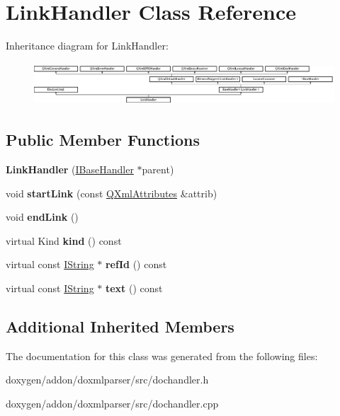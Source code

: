 \hypertarget{class_link_handler}{}\section{Link\+Handler Class Reference}
\label{class_link_handler}
Inheritance diagram for Link\+Handler\+:\begin{figure}[H]
\begin{center}
\leavevmode
\includegraphics[height=1.600000cm]{class_link_handler}
\end{center}
\end{figure}
\subsection*{Public Member Functions}
\begin{DoxyCompactItemize}
\item 
\mbox{\label{class_link_handler_ab840f56fe3544cff880191770eafa8ea}} 
{\bfseries Link\+Handler} (\mbox{\hyperlink{class_i_base_handler}{I\+Base\+Handler}} $\ast$parent)
\item 
\mbox{\label{class_link_handler_a168e6fb1834fe465c2b419aef08d7fc0}} 
void {\bfseries start\+Link} (const \mbox{\hyperlink{class_q_xml_attributes}{Q\+Xml\+Attributes}} \&attrib)
\item 
\mbox{\label{class_link_handler_a04d018a5461eae27af1776b451fa15cb}} 
void {\bfseries end\+Link} ()
\item 
\mbox{\label{class_link_handler_a9fcaa3f5f3540fabf1f6851a36494ebb}} 
virtual Kind {\bfseries kind} () const
\item 
\mbox{\label{class_link_handler_a09392fa590c188d58f99e4f86fca73f4}} 
virtual const \mbox{\hyperlink{class_i_string}{I\+String}} $\ast$ {\bfseries ref\+Id} () const
\item 
\mbox{\label{class_link_handler_a449e4571c4a280f5f38fdceb01e14ecd}} 
virtual const \mbox{\hyperlink{class_i_string}{I\+String}} $\ast$ {\bfseries text} () const
\end{DoxyCompactItemize}
\subsection*{Additional Inherited Members}


The documentation for this class was generated from the following files\+:\begin{DoxyCompactItemize}
\item 
doxygen/addon/doxmlparser/src/dochandler.\+h\item 
doxygen/addon/doxmlparser/src/dochandler.\+cpp\end{DoxyCompactItemize}
